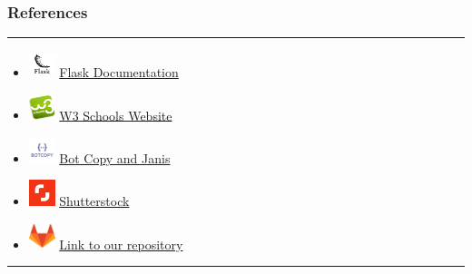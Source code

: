\documentclass[14pt]{beamer}
\begin{document}
\begin{frame}
	\frametitle{References}
    \noindent
    {\color{pink} \rule{\linewidth}{0.7mm}}
    \begin{itemize}
        \item [] \includegraphics[width=0.3in, height=0.3in]{./Codiac/logos/documentation.png} \href{https://flask.palletsprojects.com/en/1.1.x/} {Flask Documentation}\\
            \pause
        \item [] \includegraphics[width=0.3in, height=0.3in]{./Codiac/logos/w3schools.png} \href{https://www.w3schools.com/} {W3 Schools Website}\\
             \pause
         \item [] \includegraphics[width=0.3in, height=0.3in]{./Codiac/logos/botcopy.png} \href{https://www.botcopy.com/} {Bot Copy and Janis}\\
            \pause
        \item [] \includegraphics[width=0.3in, height=0.3in]{./Codiac/logos/shutter.png} \href{https://www.shutterstock.com/?rid=170336628&gclid=Cj0KCQjwnqH7BRDdARIsACTSAdvbnRVMWw3_B9aDsAxuGgPnMgjnuE9Gdei2Z510VfgXOn-pviSB-YMaAv6vEALw_wcB} {Shutterstock}\\
            \pause
         \item [] \includegraphics[width=0.3in, height=0.3in]{./Codiac/logos/gitlab.png} \href{https://gitlab.com/ksaisudha24/Codiac}{Link to our repository}\\
    \end{itemize}
    \noindent
    {\color{pink} \rule{\linewidth}{0.7mm}}
\end{frame}
\end{document}
